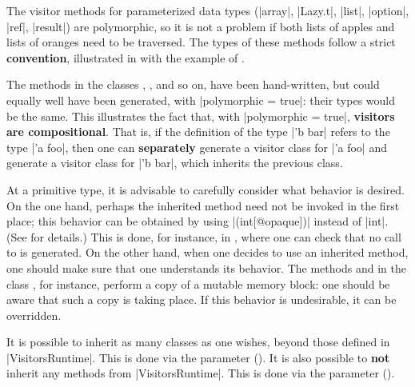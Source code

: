 \documentclass[11pt,a4paper,twoside]{article}
\renewcommand{\emph}[1]{\textbf{#1}}
\begin{document}
The visitor methods for parameterized data types (\oc|array|, \oc|Lazy.t|,
\oc|list|, \oc|option|, \oc|ref|, \oc|result|) are polymorphic, so it is not a
problem if both lists of apples and lists of oranges need to be traversed.
The types of these methods follow a strict \emph{convention},
illustrated in  with the example of .

The  methods in the classes , ,
and so on, have been hand-written, but could equally well have been generated,
with \oc|polymorphic = true|: their types would be the same.
%
%
This illustrates the fact that, with \oc|polymorphic = true|,
\emph{visitors are compositional}.
%
%
That is, if the definition of the type \oc|'b bar| refers to the type \oc|'a foo|,
then one can \emph{separately} generate a visitor class for \oc|'a foo|
and generate a visitor class for \oc|'b bar|, which inherits the previous class.

At a primitive type, it is advisable to carefully consider what
behavior is desired. On the one hand, perhaps the inherited method
 need not be invoked in the first place; this behavior can
be obtained by using \oc|(int[@opaque])| instead of \oc|int|. (See
 for details.) This is done, for instance, in
, where one can check that no call to  is
generated. On the other hand, when one decides to use an inherited method, one
should make sure that one understands its behavior. The methods
 and  in the class
, for instance, perform a copy of a mutable memory
block: one should be aware that such a copy is taking place. If this behavior
is undesirable, it can be overridden.

It is possible to inherit as many classes as one wishes, beyond those defined
in \oc|VisitorsRuntime|. This is done via the \ancestors parameter
(). It is also possible to \emph{not} inherit any methods
from \oc|VisitorsRuntime|. This is done via the \nude parameter
().

\end{document}
